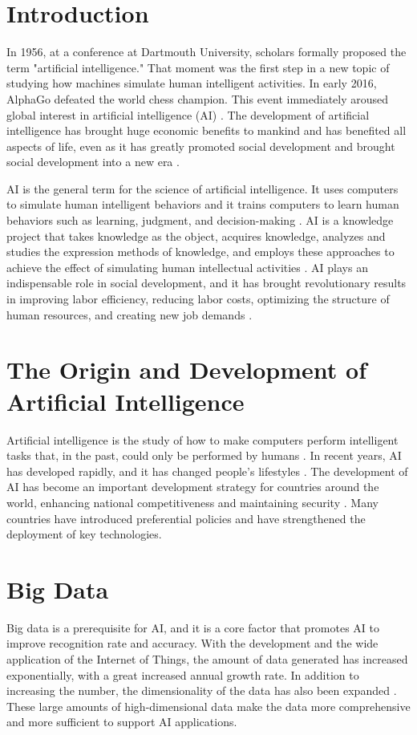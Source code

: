 \documentclass[12pt, a4paper]{article}
\begin{document}
\newpage  

\section{Introduction}
In 1956, at a conference at Dartmouth University, scholars formally proposed the term "artificial intelligence." That moment was the first step in a new topic of studying how machines simulate human intelligent activities. In early 2016, AlphaGo defeated the world chess champion. This event immediately aroused global interest in artificial intelligence (AI) \cite{zhang2021}. The development of artificial intelligence has brought huge economic benefits to mankind and has benefited all aspects of life, even as it has greatly promoted social development and brought social development into a new era \cite{ding2020}. 

AI is the general term for the science of artificial intelligence. It uses computers to simulate human intelligent behaviors and it trains computers to learn human behaviors such as learning, judgment, and decision-making \cite{feng2001}. AI is a knowledge project that takes knowledge as the object, acquires knowledge, analyzes and studies the expression methods of knowledge, and employs these approaches to achieve the effect of simulating human intellectual activities \cite{li2001}. AI plays an indispensable role in social development, and it has brought revolutionary results in improving labor efficiency, reducing labor costs, optimizing the structure of human resources, and creating new job demands \cite{hamet2017}.

\newpage  

\section{The Origin and Development of Artificial Intelligence}
Artificial intelligence is the study of how to make computers perform intelligent tasks that, in the past, could only be performed by humans \cite{zhang2021}. In recent years, AI has developed rapidly, and it has changed people's lifestyles \cite{ding2020}. The development of AI has become an important development strategy for countries around the world, enhancing national competitiveness and maintaining security \cite{duan2019}. Many countries have introduced preferential policies and have strengthened the deployment of key technologies.

\section{Big Data}
Big data is a prerequisite for AI, and it is a core factor that promotes AI to improve recognition rate and accuracy. With the development and the wide application of the Internet of Things, the amount of data generated has increased exponentially, with a great increased annual growth rate. In addition to increasing the number, the dimensionality of the data has also been expanded \cite{duan2019b}. These large amounts of high-dimensional data make the data more comprehensive and more sufficient to support AI applications.
\end{document}
